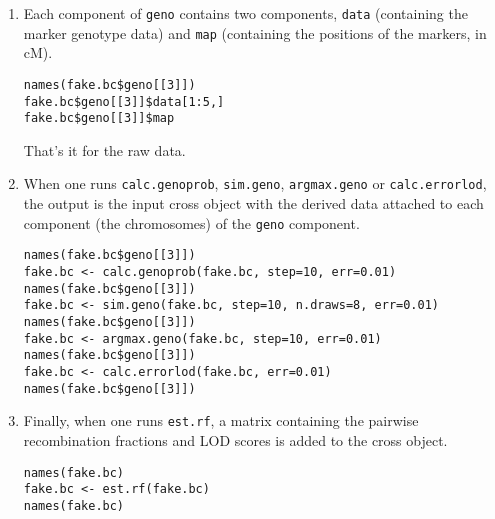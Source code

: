 \documentclass[10pt,letterpaper]{article}
\newcommand{\usercolor}{\color [named]{BlueViolet}}
\begin{document}
\begin{enumerate}
\item Each component of \verb-geno- contains two components,
\verb-data- (containing the marker genotype data) and \verb-map-
(containing the positions of the markers, in cM).

\usercolor
\verb|names(fake.bc$geno[[3]])| \\ %
\verb|fake.bc$geno[[3]]$data[1:5,]| \\ 
\verb|fake.bc$geno[[3]]$map|
\normalcolor

That's it for the raw data.

\item When one runs \verb-calc.genoprob-, \verb-sim.geno-,
\verb-argmax.geno- or \verb-calc.errorlod-, the output is the input
cross object with the derived data attached to each component (the
chromosomes) of the \verb-geno- component.  

\usercolor
\verb|names(fake.bc$geno[[3]])| \\ %
\verb|fake.bc <- calc.genoprob(fake.bc, step=10, err=0.01)| \\
\verb|names(fake.bc$geno[[3]])| \\ %
\verb|fake.bc <- sim.geno(fake.bc, step=10, n.draws=8, err=0.01)| \\
\verb|names(fake.bc$geno[[3]])| \\ %
\verb|fake.bc <- argmax.geno(fake.bc, step=10, err=0.01)| \\
\verb|names(fake.bc$geno[[3]])| \\ %
\verb|fake.bc <- calc.errorlod(fake.bc, err=0.01)| \\
\verb|names(fake.bc$geno[[3]])|%
\normalcolor

\item Finally, when one runs \verb-est.rf-, a matrix containing the
pairwise recombination fractions and LOD scores is added to the cross
object.

\usercolor
\verb|names(fake.bc)| \\
\verb|fake.bc <- est.rf(fake.bc)| \\
\verb|names(fake.bc)|
\normalcolor

\end{enumerate}
\end{document}
